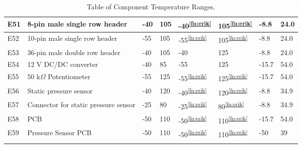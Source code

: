 \begin{longtable}{|m{1cm}|m{3.5cm}|m{1.3cm}|m{1.3cm}|m{1.4cm}|m{1.3cm}|m{1.3cm}|m{1.3cm}|}
E51 & 8-pin male single row header& -40 & 105 & -40\textsuperscript{\ref{fn:erik}} & 105\textsuperscript{\ref{fn:erik}} & -8.8 & 24.0  \\ \hline
E52 & 10-pin male single row header & -55 & 105 & -55\textsuperscript{\ref{fn:erik}} & 105\textsuperscript{\ref{fn:erik}} & -8.8 & 24.0  \\ \hline
E53 & 36-pin male double row header & -40 & 105 & -40 & 125 & -8.8 & 24.0  \\ \hline
E54 & 12 V DC/DC converter & -40 & 85 & -55 & 125 & -15.7 & 54.0  \\ \hline
E55 & 50 k$\Omega$ Potentiometer & -55 & 125 & -55\textsuperscript{\ref{fn:erik}} & 125\textsuperscript{\ref{fn:erik}} & -15.7 & 54.0  \\ \hline
E56 & Static pressure sensor & -40 & 120 & -40\textsuperscript{\ref{fn:erik}} & 120\textsuperscript{\ref{fn:erik}} &  -8.8 & 34.9 \\ \hline
E57 & Connector for static pressure sensor & -25 & 80 & -25\textsuperscript{\ref{fn:erik}} & 80\textsuperscript{\ref{fn:erik}} &  -8.8 & 34.9 \\ \hline
E58 & PCB & -50 & 110 & -50\textsuperscript{\ref{fn:erik}} & 110\textsuperscript{\ref{fn:erik}} & -15.7 & 54.0 \\ \hline
E59 & Pressure Sensor PCB & -50 & 110 & -50\textsuperscript{\ref{fn:erik}} & 110\textsuperscript{\ref{fn:erik}} & -50 & 39 \\ \hline


\caption{Table of Component Temperature Ranges.}
\label{tab:thermal-table}
\end{longtable}
\raggedbottom








